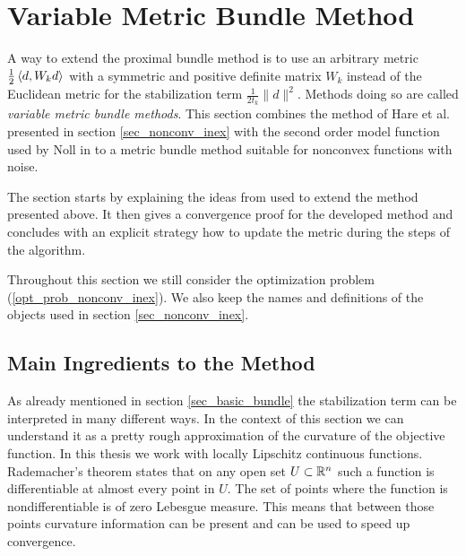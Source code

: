 \section{Variable Metric Bundle Method}
\label{sec_variable_metric}


A way to extend the proximal bundle method is to use an arbitrary metric \(\frac{1}{2}\left\langle d,W_kd \right\rangle\) with a symmetric and positive definite matrix \(W_k\) instead of the Euclidean metric for the stabilization term \(\frac{1}{2t_k}\|d\|^2\). Methods doing so are called \emph{variable metric bundle methods}.
This section combines the method of Hare et al. presented in section \ref{sec_nonconv_inex} with the second order model function used by Noll in \cite{Noll2013} to a metric bundle method suitable for nonconvex functions with noise.

The section starts by explaining the ideas from \cite{Noll2013} used to extend the method presented above. It then gives a convergence proof for the developed method and concludes with an explicit strategy how to update the metric during the steps of the algorithm.

Throughout this section we still consider the optimization problem (\ref{opt_prob_nonconv_inex}). We also keep the names and definitions of the objects used in section \ref{sec_nonconv_inex}.

\subsection{Main Ingredients to the Method}

As already mentioned in section \ref{sec_basic_bundle} the stabilization term can be interpreted in many different ways. In the context of this section we can understand it as a pretty rough approximation of the curvature of the objective function.
In this thesis we work with locally Lipschitz continuous functions. Rademacher's theorem \cite[Theorem 3.1, p. 18]{Heinonen2004} states that on any open set \(U \subset \mathbb{R}^n\) such a function is differentiable at almost every point in \(U\). The set of points where the function is nondifferentiable is of zero Lebesgue measure.
This means that between those points curvature information can be present and can be used to speed up convergence.

